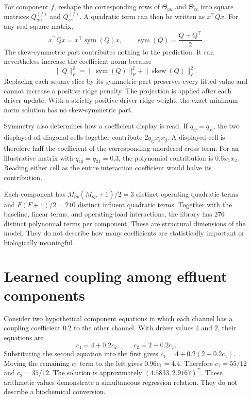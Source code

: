For component \(f\), reshape the corresponding rows of \(\Theta_{uu}\) and \(\Theta_{cc}\) into square matrices \(Q_{uu}^{(f)}\) and \(Q_{cc}^{(f)}\). A quadratic term can then be written as \(x^\top Qx\). For any real square matrix,
\begin{equation}
\label{eq:icsor_quadratic_symmetry}
x^\top Qx=x^\top\operatorname{sym}(Q)x,
\qquad
\operatorname{sym}(Q)=\frac{Q+Q^\top}{2}.
\end{equation}
The skew-symmetric part contributes nothing to the prediction. It can nevertheless increase the coefficient norm because
\begin{equation}
\label{eq:icsor_quadratic_norm}
\|Q\|_F^2=
\|\operatorname{sym}(Q)\|_F^2+
\|\operatorname{skew}(Q)\|_F^2.
\end{equation}
Replacing each square slice by its symmetric part preserves every fitted value and cannot increase a positive ridge penalty. The projection is applied after each driver update. With a strictly positive driver ridge weight, the exact minimum-norm solution has no skew-symmetric part.

Symmetry also determines how a coefficient display is read. If \(q_{ij}=q_{ji}\), the two displayed off-diagonal cells together contribute \(2q_{ij}x_i x_j\). A displayed cell is therefore half the coefficient of the corresponding unordered cross term. For an illustrative matrix with \(q_{12}=q_{21}=0.3\), the polynomial contribution is \(0.6x_1x_2\). Reading either cell as the entire interaction coefficient would halve its contribution.

Each component has \(M_{op}(M_{op}+1)/2=3\) distinct operating quadratic terms and \(F(F+1)/2=210\) distinct influent quadratic terms. Together with the baseline, linear terms, and operating-load interactions, the library has 276 distinct polynomial terms per component. These are structural dimensions of the model. They do not describe how many coefficients are statistically important or biologically meaningful.

\section{Learned coupling among effluent components}

Consider two hypothetical component equations in which each channel has a coupling coefficient 0.2 to the other channel. With driver values 4 and 2, their equations are
\begin{equation}
\label{eq:icsor_scalar_coupling_example}
c_1=4+0.2c_2,
\qquad c_2=2+0.2c_1.
\end{equation}
Substituting the second equation into the first gives \(c_1=4+0.2(2+0.2c_1)\). Moving the remaining \(c_1\) term to the left gives \(0.96c_1=4.4\). Therefore \(c_1=55/12\) and \(c_2=35/12\). The solution is approximately \((4.5833,2.9167)^\top\). These arithmetic values demonstrate a simultaneous regression relation. They do not describe a biochemical conversion.

